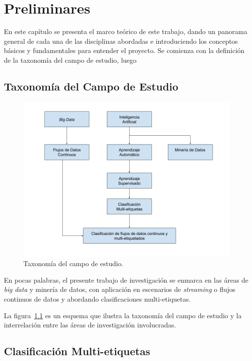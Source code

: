 \chapter{Preliminares}

En este capítulo se presenta el marco teórico de este trabajo, dando un panorama
general de cada una de las disciplinas abordadas e introduciendo los conceptos
básicos y fundamentales para entender el proyecto. Se comienza con la definición
de la taxonomía del campo de estudio, luego 

\section{Taxonomía del Campo de Estudio}

\begin{figure}[htbp]
	\includegraphics[width=.9\linewidth]{figures/study_field_taxonomy_v2.png}
	\centering
	\caption{Taxonomía del campo de estudio.}
	\label{fig:campo_estudio}
\end{figure}

En pocas palabras, el presente trabajo de investigación se enmarca en las áreas
de \textit{big data} y minería de datos, con aplicación en escenarios de
\textit{streaming} o flujos continuos de datos y abordando clasificaciones
multi-etiquetas.

La figura~\ref{fig:campo_estudio} es un esquema que ilustra la taxonomía del
campo de estudio y la interrelación entre las áreas de investigación
involucradas.

\section{Clasificación Multi-etiquetas}


